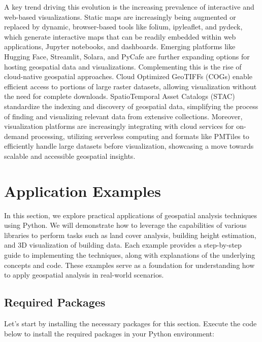 A key trend driving this evolution is the increasing prevalence of interactive and web-based visualizations. Static maps are increasingly being augmented or replaced by dynamic, browser-based tools like folium, ipyleaflet, and pydeck, which generate interactive maps that can be readily embedded within web applications, Jupyter notebooks, and dashboards. Emerging platforms like Hugging Face, Streamlit, Solara, and PyCafe are further expanding options for hosting geospatial data and visualizations. Complementing this is the rise of cloud-native geospatial approaches. Cloud Optimized GeoTIFFs (COGs) enable efficient access to portions of large raster datasets, allowing visualization without the need for complete downloads. SpatioTemporal Asset Catalogs (STAC) standardize the indexing and discovery of geospatial data, simplifying the process of finding and visualizing relevant data from extensive collections. Moreover, visualization platforms are increasingly integrating with cloud services for on-demand processing, utilizing serverless computing and formats like PMTiles to efficiently handle large datasets before visualization, showcasing a move towards scalable and accessible geospatial insights.

\section{Application Examples}\label{sec:Application}

In this section, we explore practical applications of geospatial analysis techniques using Python. We will demonstrate how to leverage the capabilities of various libraries to perform tasks such as land cover analysis, building height estimation, and 3D visualization of building data. Each example provides a step-by-step guide to implementing the techniques, along with explanations of the underlying concepts and code. These examples serve as a foundation for understanding how to apply geospatial analysis in real-world scenarios.

\subsection{Required Packages}

Let's start by installing the necessary packages for this section. Execute the code below to install the required packages in your Python environment:

\begin{lstlisting}[language=Python]
%pip install maplibre rasterstats overturemaps rioxarray planetary-computer kaleido
\end{lstlisting}

